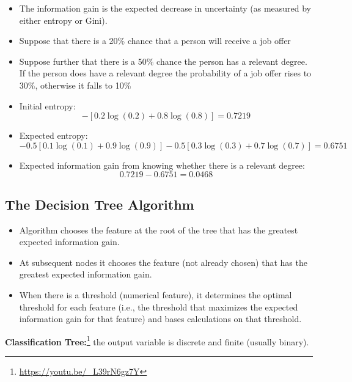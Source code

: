 \begin{itemize}
    \item The information gain is the expected decrease in uncertainty (as measured by either entropy or Gini).
    \item Suppose that there is a 20\% chance that a person will receive a job offer
    \item Suppose further that there is a 50\% chance the person has a relevant degree. If the person does have a relevant degree the probability of a job offer rises to 30\%, otherwise it falls to 10\%
    \item Initial entropy:
    \begin{equation*}
        -[ 0.2\log(0.2) +0.8\log(0.8)] =0.7219
    \end{equation*}
    \item Expected entropy:
    \begin{equation*}
        -0.5\left[ 0.1\log\left(0.1\right) +0.9\log\left(0.9\right)\right] -0.5\left[ 0.3\log\left(0.3\right) +0.7\log\left(0.7\right)\right] = 0.6751
    \end{equation*}
    \item Expected information gain from knowing whether there is a relevant degree:
    \begin{equation*}
        0.7219-0.6751=0.0468
    \end{equation*}
\end{itemize}

\subsection{The Decision Tree Algorithm}

\begin{itemize}
    \item Algorithm chooses the feature at the root of the tree that has the greatest expected information gain.
    \item At subsequent nodes it chooses the feature (not already chosen) that has the greatest expected information gain.
    \item When there is a threshold (numerical feature), it determines the optimal threshold for each feature (i.e., the threshold that maximizes the expected information gain for that feature) and bases calculations on that threshold.
\end{itemize}

\textbf{Classification Tree:}\footnote{\url{https://youtu.be/_L39rN6gz7Y}} the output variable is discrete and finite (usually binary).

